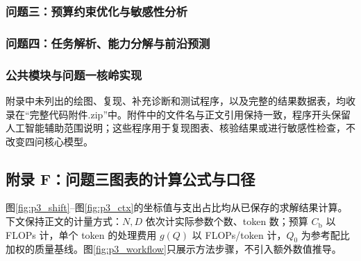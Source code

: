 \subsubsection*{问题三：预算约束优化与敏感性分析}


\subsubsection*{问题四：任务解析、能力分解与前沿预测}


\subsubsection*{公共模块与问题一核岭实现}






附录中未列出的绘图、复现、补充诊断和测试程序，以及完整的结果数据表，均收录在“完整代码附件.zip”中。附件中的文件名与正文引用保持一致，程序开头保留人工智能辅助范围说明；这些程序用于复现图表、核验结果或进行敏感性检查，不改变四问核心模型。

\clearpage
\subsection*{附录 F：问题三图表的计算公式与口径}

图\ref{fig:p3_shift}--图\ref{fig:p3_ctx}的坐标值与支出占比均从已保存的求解结果计算。下文保持正文的计量方式：$N,D$ 依次计实际参数个数、token 数；预算 $C_{\mathrm b}$ 以 FLOPs 计，单个 token 的处理费用 $g(Q)$ 以 FLOPs/token 计，$Q_0$ 为参考配比加权的质量基线。图\ref{fig:p3_workflow}只展示方法步骤，不引入额外数值推导。

